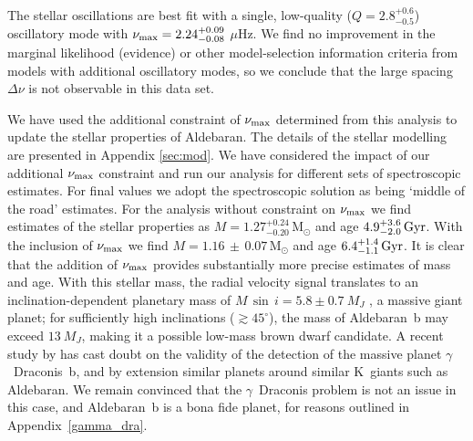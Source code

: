\documentclass[modern]{aastex61}
\newcommand{\numax}{\mbox{$\nu_{\rm max}$}\xspace}
\newcommand{\muHz}{\mbox{$\mu$Hz}\xspace}
\newcommand{\twosidedrange}[3]{\ensuremath{#1^{+#2}_{-#3}}}
\newcommand{\CombinedQRange}{\twosidedrange{2.8}{0.6}{0.5}}
\begin{document}
The stellar oscillations are best fit with a single, low-quality ($Q =
\CombinedQRange{}$) oscillatory mode with $\numax = 2.24^{+ 0.09}_{- 0.08}$
\muHz.  We find no improvement in the marginal likelihood (evidence) or other
model-selection information criteria \citep{Gelman2013} from models with
additional oscillatory modes, so we conclude that the large spacing $\Delta\nu$
is not observable in this data set.

We have used the additional constraint of \numax determined from this analysis
to update the stellar properties of Aldebaran.  The details of the stellar
modelling are presented in Appendix \ref{sec:mod}.  We have considered the
impact of our additional \numax constraint and run our analysis for different
sets of spectroscopic estimates.  For final values we adopt the
\citet{2012Sheffield} spectroscopic solution as being `middle of the road'
estimates.  For the analysis without constraint on \numax we find estimates of
the stellar properties as $M = 1.27^{+0.24}_{-0.20} \, \mathrm{M_{\odot}}$ and
age $4.9^{+3.6}_{-2.0} \, \rm Gyr$.  With the inclusion of \numax we find $M =
1.16\, \pm \, {0.07} \, \mathrm{M_{\odot}}$ and age $6.4^{+1.4}_{-1.1} \, \rm
Gyr$.  It is clear that the addition of \numax provides substantially more
precise estimates of mass and age. With this stellar mass, the radial velocity
signal translates to an inclination-dependent planetary mass of $M\,\sin\,{i} =
5.8 \pm 0.7~M_J$ \citep[Equation~1]{Torres2008}, a massive giant planet; for
sufficiently high inclinations ($\gtrsim 45^\circ$), the mass of Aldebaran~b may
exceed $13~M_J$, making it a possible low-mass brown dwarf candidate. A recent
study by \citet{2018arXiv180105239H} has cast doubt on the validity of the
detection of the massive planet $\gamma$~Draconis~b, and by extension similar
planets around similar K~giants such as Aldebaran. We remain convinced that the
$\gamma$~Draconis problem is not an issue in this case, and Aldebaran~b is a
bona fide planet, for reasons outlined in Appendix~\ref{gamma_dra}.
\end{document}
